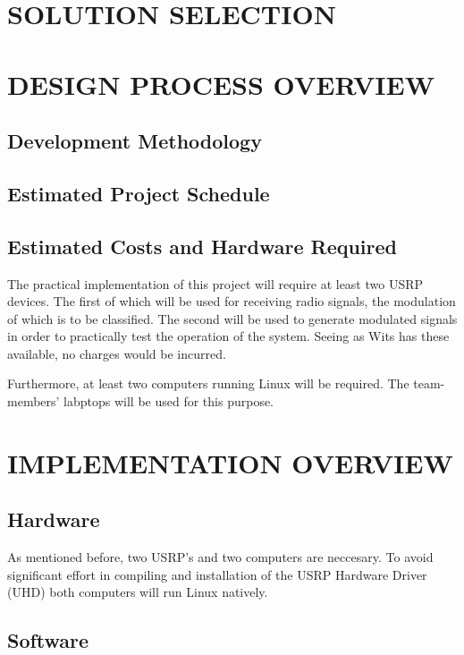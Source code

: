 \documentclass[10pt,twocolumn]{witseiepaper}
\begin{document}
\section{SOLUTION SELECTION}

\section{DESIGN PROCESS OVERVIEW}
	\subsection{Development Methodology}
	\subsection{Estimated Project Schedule}
	\subsection{Estimated Costs and Hardware Required}
		The practical implementation of this project will require at least two USRP devices. The first of which will be used for receiving radio signals, the modulation of which is to be classified. The second will be used to generate modulated signals in order to practically test the operation of the system. Seeing as Wits has these available, no charges would be incurred.

		Furthermore, at least two computers running Linux will be required. The team-members' labptops will be used for this purpose.

\section{IMPLEMENTATION OVERVIEW}
	\subsection{Hardware}
	As mentioned before, two USRP's and two computers are neccesary. To avoid significant effort in compiling and installation of the USRP Hardware Driver (UHD) both computers will run Linux natively.

	\subsection{Software}
\end{document}
